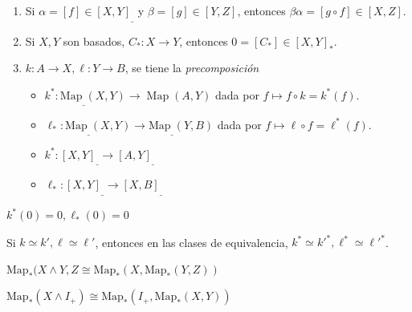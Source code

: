 \begin{tcolorbox}[colback=antiquefuchsia!15!white,colframe=antiquefuchsia!75!black,title=\textbf{Observación}\index{precomposición}]
    \begin{enumerate}[noitemsep, topsep=0pt]
        \item Si \(\alpha=[f]\in[X, Y]_{\_}\) y \(\beta=[g]\in[Y, Z]\), entonces \(\beta\alpha=[g\circ f]\in [X, Z]\).
        \item Si \(X, Y\) son basados, \(C_\ast\colon X\to Y\), entonces \(0=[C_\ast]\in[X, Y]_{\ast}\).
        \item \(k\colon A\to X, \ell\colon Y\to B\), se tiene la \textit{precomposición}
            \begin{itemize}[noitemsep, topsep=0pt]
                \item[] \(k^{\ast}\colon \operatorname{Map_\_}(X, Y)\to \operatorname{Map}(A, Y)\) dada por \(f\mapsto f\circ k = k^{\ast}(f)\).
                \item[] \(\ell_{\ast}\colon \operatorname{Map_\_}(X, Y)\to \operatorname{Map_\_}(Y, B)\) dada por \(f\mapsto \ell\circ f = \ell^{\ast}(f)\).
            \end{itemize}
            \begin{itemize}[noitemsep, topsep=0pt]
                \item[] \(k^{\ast}\colon [X, Y]_\_\to [A, Y]_\_\)
                \item[] \(\ell_{\ast}\colon [X, Y]_\_\to [X, B]_\_\)
            \end{itemize}
    \end{enumerate}
    \tcblower
    \(k^{\ast}(0)=0, \ell_{\ast}(0)=0\)
\end{tcolorbox}

\begin{tcolorbox}[colback=blue!5!white,colframe=blue!75!blue,title=\textbf{Hecho}.]
    Si \(k\simeq k', \ell\simeq\ell'\), entonces en las clases de equivalencia, \(k^{\ast}\simeq k'^{\ast}, \ell^{\ast}\simeq\ell'^{\ast}\).
\end{tcolorbox}

\begin{tcolorbox}[colback=blue!5!white,colframe=blue!75!blue,title=\textbf{Ley exponencial para el smash}.\index{ley exponencial para el smash}]
    \(\operatorname{Map_\ast}(X\wedge Y, Z\cong\operatorname{Map_\ast}(X, \operatorname{Map_\ast}(Y, Z))\)

    \(\operatorname{Map_\ast}(X\wedge I_{+})\cong\operatorname{Map_\ast}(I_{+}, \operatorname{Map_\ast}(X, Y))\)
\end{tcolorbox}

